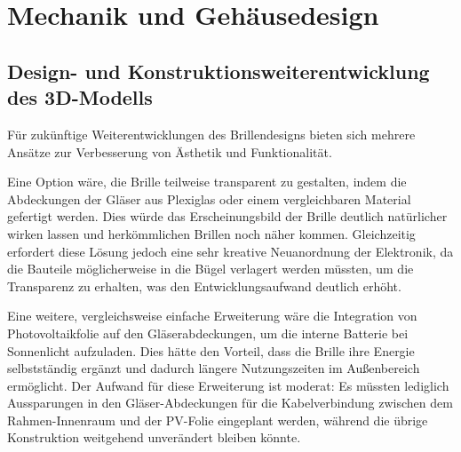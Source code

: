 \section{Mechanik und Gehäusedesign}

\subsection{Design- und Konstruktionsweiterentwicklung des 3D-Modells}
\label{sec:future_3ddruck}
Für zukünftige Weiterentwicklungen des Brillendesigns bieten sich mehrere Ansätze zur Verbesserung von Ästhetik und Funktionalität.

Eine Option wäre, die Brille teilweise transparent zu gestalten, indem die Abdeckungen der Gläser aus Plexiglas oder einem vergleichbaren Material gefertigt werden. Dies würde das Erscheinungsbild der Brille deutlich natürlicher wirken lassen und herkömmlichen Brillen noch näher kommen. Gleichzeitig erfordert diese Lösung jedoch eine sehr kreative Neuanordnung der Elektronik, da die Bauteile möglicherweise in die Bügel verlagert werden müssten, um die Transparenz zu erhalten, was den Entwicklungsaufwand deutlich erhöht.

Eine weitere, vergleichsweise einfache Erweiterung wäre die Integration von Photovoltaikfolie auf den Gläserabdeckungen, um die interne Batterie bei Sonnenlicht aufzuladen. Dies hätte den Vorteil, dass die Brille ihre Energie selbstständig ergänzt und dadurch längere Nutzungszeiten im Außenbereich ermöglicht.\newline
Der Aufwand für diese Erweiterung ist moderat: Es müssten lediglich Aussparungen in den Gläser-Abdeckungen für die Kabelverbindung zwischen dem Rahmen-Innenraum und der PV-Folie eingeplant werden, während die übrige Konstruktion weitgehend unverändert bleiben könnte.